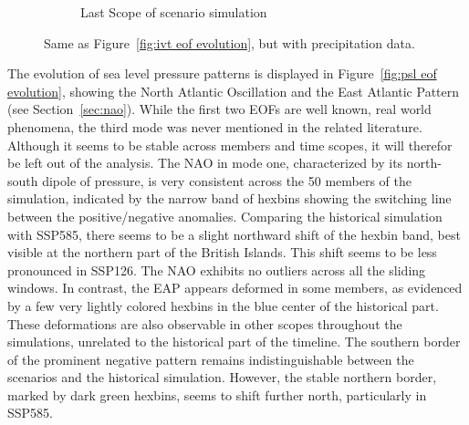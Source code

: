 \begin{figure}[!tbp]
\begin{subfigure}[b]{0.49\textwidth}
    \caption{Last Scope of scenario simulation}
    \label{fig:pr spatial patterns endscenario}
  \end{subfigure}
  \caption{Same as Figure~\ref{fig:ivt eof evolution}, but with precipitation data.}\label{fig:pr eof evolution}
\end{figure}

The evolution of sea level pressure patterns is displayed in Figure~\ref{fig:psl eof evolution}, showing the North Atlantic Oscillation  and the East Atlantic Pattern (see Section~\ref{sec:nao}). 
While the first two EOFs are well known, real world phenomena, the third mode was never mentioned in the related literature. 
Although it seems to be stable across members and time scopes, it will therefor be left out of the analysis. 
The NAO in mode one, characterized by its north-south dipole of pressure, is very consistent across the 50 members of the simulation, indicated by the narrow band of hexbins showing the switching line between the positive/negative anomalies. 
Comparing the historical simulation with SSP585, there seems to be a slight northward shift of the hexbin band, best visible at the northern part of the British Islands. 
This shift seems to be less pronounced in SSP126. 
The NAO exhibits no outliers across all the sliding windows. In contrast, the EAP appears deformed in some members, as evidenced by a few very lightly colored hexbins in the blue center of the historical part. These deformations are also observable in other scopes throughout the simulations, unrelated to the historical part of the timeline.
The southern border of the prominent negative pattern remains indistinguishable between the scenarios and the historical simulation. However, the stable northern border, marked by dark green hexbins, seems to shift further north, particularly in SSP585.


